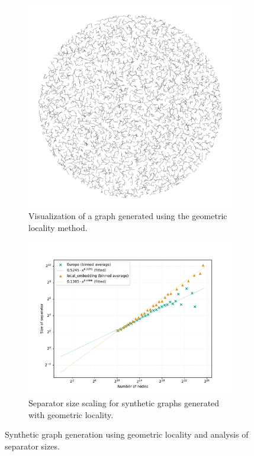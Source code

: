 \begin{figure}
	\begin{subfigure}{0.35\linewidth}
		\centering
		\includegraphics[width=\linewidth]{graphics/local_embedding.png}
		\caption{Visualization of a graph generated using the geometric locality method.}
		\label{fig:geometric_locality_graph_viz}
	\end{subfigure}
	\hfill
	\begin{subfigure}{0.55\linewidth}
		\centering
		\includegraphics[width=\linewidth]{graphics/sep_local_embedding.pdf}
		\caption{Separator size scaling for synthetic graphs generated with geometric locality.}
		\label{fig:geometric_locality_sep_plot}
	\end{subfigure} 
	\caption{Synthetic graph generation using geometric locality and analysis of separator sizes.}
	\label{fig:geometric_locality_separators}
\end{figure}


